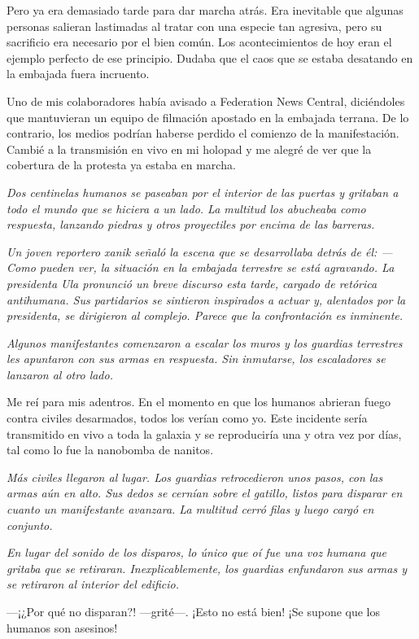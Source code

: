 Pero ya era demasiado tarde para dar marcha atrás. Era inevitable que algunas personas salieran lastimadas al tratar con una especie tan agresiva, pero su sacrificio era necesario por el bien común. Los acontecimientos de hoy eran el ejemplo perfecto de ese principio. Dudaba que el caos que se estaba desatando en la embajada fuera incruento.

Uno de mis colaboradores había avisado a Federation News Central, diciéndoles que mantuvieran un equipo de filmación apostado en la embajada terrana. De lo contrario, los medios podrían haberse perdido el comienzo de la manifestación. Cambié a la transmisión en vivo en mi holopad y me alegré de ver que la cobertura de la protesta ya estaba en marcha.

\textit{Dos centinelas humanos se paseaban por el interior de las puertas y gritaban a todo el mundo que se hiciera a un lado. La multitud los abucheaba como respuesta, lanzando piedras y otros proyectiles por encima de las barreras.}

\textit{Un joven reportero xanik señaló la escena que se desarrollaba detrás de él: —Como pueden ver, la situación en la embajada terrestre se está agravando. La presidenta Ula pronunció un breve discurso esta tarde, cargado de retórica antihumana. Sus partidarios se sintieron inspirados a actuar y, alentados por la presidenta, se dirigieron al complejo. Parece que la confrontación es inminente.}

\textit{Algunos manifestantes comenzaron a escalar los muros y los guardias terrestres les apuntaron con sus armas en respuesta. Sin inmutarse, los escaladores se lanzaron al otro lado.}

Me reí para mis adentros. En el momento en que los humanos abrieran fuego contra civiles desarmados, todos los verían como yo. Este incidente sería transmitido en vivo a toda la galaxia y se reproduciría una y otra vez por días, tal como lo fue la nanobomba de nanitos.

\textit{Más civiles llegaron al lugar. Los guardias retrocedieron unos pasos, con las armas aún en alto. Sus dedos se cernían sobre el gatillo, listos para disparar en cuanto un manifestante avanzara. La multitud cerró filas y luego cargó en conjunto.}

\textit{En lugar del sonido de los disparos, lo único que oí fue una voz humana que gritaba que se retiraran. Inexplicablemente, los guardias enfundaron sus armas y se retiraron al interior del edificio.}

—¡¿Por qué no disparan?! —grité—. ¡Esto no está bien! ¡Se supone que los humanos son asesinos!

